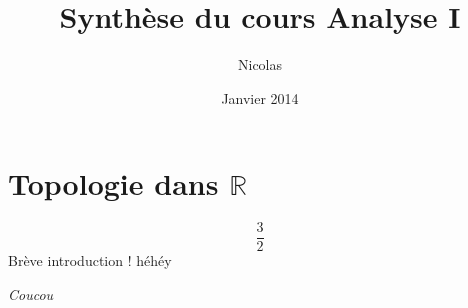 \documentclass[11pt, a4paper]{article}
\author{Nicolas \bsc{Englebert}}
\title{Synthèse du cours Analyse I}
\date{Janvier 2014}
\begin{document}
\maketitle
\tableofcontents


\section{Topologie dans $\mathbb{R}$}
\begin{equation}
\frac{3}{2}
\end{equation}
Brève introduction ! héhéy 

\emph{Coucou}
\end{document}
